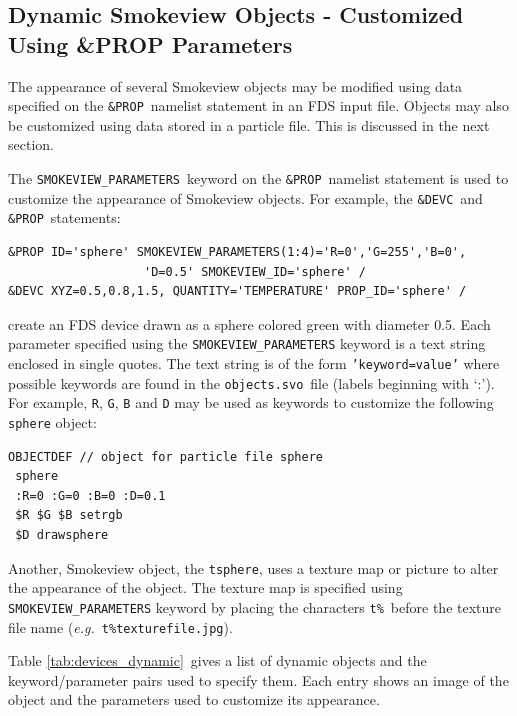 \subsection{Dynamic Smokeview Objects - Customized Using \&PROP Parameters}
\label{info:SMOKEVIEW_PARAMETERS}

The appearance of several Smokeview objects may be modified using data specified on the {\tt \&PROP}\ namelist statement in an FDS input
file.  Objects may also be customized using data stored in a particle file.  This is discussed in the next section.

The {\tt SMOKEVIEW\_PARAMETERS}\ keyword on the {\tt \&PROP}\
namelist statement is used to customize the appearance of Smokeview objects.  For example, the {\tt \&DEVC}\ and {\tt \&PROP}\ statements:
\begin{verbatim}
&PROP ID='sphere' SMOKEVIEW_PARAMETERS(1:4)='R=0','G=255','B=0',
                   'D=0.5' SMOKEVIEW_ID='sphere' /
&DEVC XYZ=0.5,0.8,1.5, QUANTITY='TEMPERATURE' PROP_ID='sphere' /
\end{verbatim}
create an FDS device drawn as a sphere colored green with diameter 0.5. Each parameter specified using the
{\tt SMOKEVIEW\_PARAMETERS} keyword
is a text string enclosed in single quotes.  The text string is of the form {\tt 'keyword=value'} where possible
keywords are found in the {\tt objects.svo}\ file (labels beginning with `:').  For example, {\tt R}, {\tt G},
{\tt B} and {\tt D} may be used as keywords to customize the following {\tt sphere} object:
\begin{verbatim}
OBJECTDEF // object for particle file sphere
 sphere
 :R=0 :G=0 :B=0 :D=0.1
 $R $G $B setrgb
 $D drawsphere
\end{verbatim}

Another, Smokeview object, the {\tt tsphere}, uses a texture map or picture to alter the appearance of the object.
The texture map is specified using {\tt SMOKEVIEW\_PARAMETERS} keyword by placing the characters {\tt t\%}\
before the texture file name ({\em e.g.}\ {\tt t\%texturefile.jpg}).

Table \ref{tab:devices_dynamic}\ gives a list of dynamic objects and the keyword/parameter pairs used to specify them.
Each entry shows an image of the object and the parameters used to customize its appearance.

